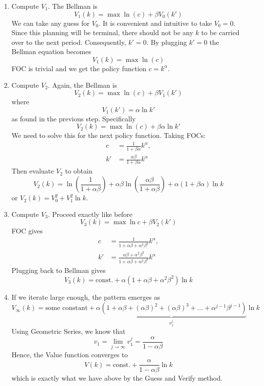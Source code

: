 \documentclass[11pt,a4paper]{book}
\theoremstyle{definition}\newtheorem{definition}{Definition}
\theoremstyle{definition}\newtheorem{fact}{Fact}
\theoremstyle{definition}\newtheorem{remark}{Remark}
\theoremstyle{definition}\newtheorem{ex}{Ex.}
\theoremstyle{definition}\newtheorem{project}{Project}
\theoremstyle{definition}\newtheorem{problem}{Problem}
\theoremstyle{definition}\newtheorem{example}{Example}
\numberwithin{theorem}{section}
\numberwithin{corollary}{chapter}
\numberwithin{assumption}{chapter}
\numberwithin{definition}{chapter}
\numberwithin{prop}{chapter}
\numberwithin{notation}{chapter}
\numberwithin{problem}{chapter}
\numberwithin{example}{chapter}
\numberwithin{fact}{chapter}
\numberwithin{ex}{chapter}
\begin{document}
	\begin{enumerate}
		\item Compute $V_1$. The Bellman is
		$$
			V_1 (k) = \max \ln(c) + \beta V_0 (k')
		$$
		We can take any guess for $V_0$. It is convenient and intuitive to take $V_0 = 0$. Since this planning will be terminal, there should not be any $k$ to be carried over to the next period. Consequently, $k'=0$. By plugging $k'=0$ the Bellman equation becomes
		$$
			V_1(k) = \max \ln(c)
		$$
		FOC is trivial and we get the policy function $c = k^\alpha$.
		\item Compute $V_2$. Again, the Bellman is
		$$
			V_2(k) = \max \ln (c) + \beta V_1 (k')
		$$
		where
		$$
			V_1(k') = \alpha \ln k'
		$$
		as found in the previous step. Specifically
		$$
			V_2(k) = \max \ln (c) + \beta\alpha\ln k'
		$$
		We need to solve this for the next policy function. Taking FOCs:
		\begin{align*}
			c &= \frac{1}{1+\beta\alpha} k^\alpha, \\
			k' &= \frac{\alpha\beta}{1+\beta\alpha} k^\alpha
		\end{align*} 
		Then evaluate $V_2$ to obtain
		$$
			V_2(k) = \ln \left( \frac{1}{1+\alpha\beta} \right) + \alpha\beta \ln \left( \frac{\alpha\beta}{1+\alpha\beta} \right) + \alpha(1+\beta\alpha)\ln k
		$$
		or $V_2(k) = V_0^2 + V_1^2 \ln k$.
		\item Compute $V_3$. Proceed exactly like before
		$$
			V_3(k) = \max \ln c + \beta V_2 (k')
		$$
		FOC gives
		\begin{align*}
			c &= \frac{1}{1+\alpha\beta + \alpha^2\beta^2} k^\alpha, \\
			k' &= \frac{\alpha\beta + \alpha^2\beta^2}{1+\alpha\beta + \alpha^2\beta^2} k^\alpha
		\end{align*}
		Plugging back to Bellman gives
		$$
			V_3(k) = \text{const.} + \alpha(1 + \alpha\beta + \alpha^2\beta^2) \ln k
		$$
		\item If we iterate large enough, the pattern emerges as
		$$
			V_{\infty} (k) = \text{some constant} + \underbrace{\alpha (1+\alpha\beta + (\alpha\beta)^2 + (\alpha\beta)^3 + \dots + \alpha^{j-1}\beta^{j-1} )}_{v_1^j} \ln k
		$$
		Using Geometric Series, we know that
		$$
			v_1 = \lim_{j\to\infty} v^j_1 = \frac{\alpha}{1-\alpha\beta}
		$$
		Hence, the Value function converges to
		$$
			V(k) = \text{const.} + \frac{\alpha}{1-\alpha\beta} \ln k
		$$
		which is exactly what we have above by the Guess and Verify method.
	\end{enumerate}
	
\end{document}
